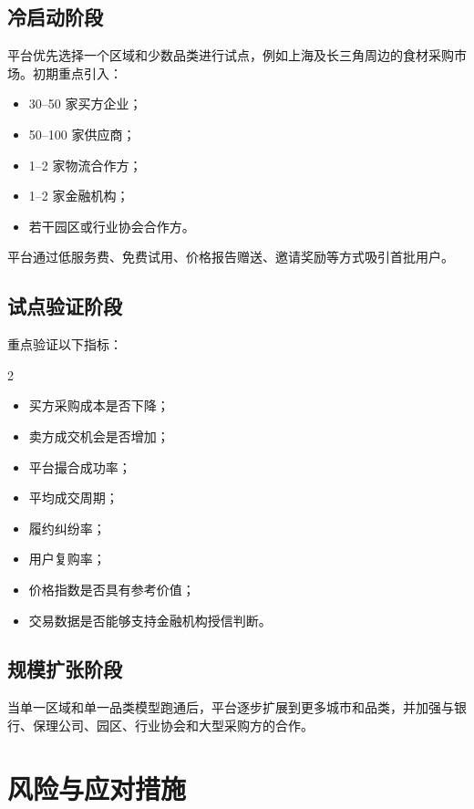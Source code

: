 \documentclass[UTF8,11pt]{ctexart}
\begin{document}
\subsection{冷启动阶段}

平台优先选择一个区域和少数品类进行试点，例如上海及长三角周边的食材采购市场。初期重点引入：

\begin{itemize}
    \item 30--50 家买方企业；
    \item 50--100 家供应商；
    \item 1--2 家物流合作方；
    \item 1--2 家金融机构；
    \item 若干园区或行业协会合作方。
\end{itemize}

平台通过低服务费、免费试用、价格报告赠送、邀请奖励等方式吸引首批用户。

\subsection{试点验证阶段}

重点验证以下指标：

\vspace{-0.5em}
\begin{multicols}{2}
    \begin{itemize}
        \item 买方采购成本是否下降；
        \item 卖方成交机会是否增加；
        \item 平台撮合成功率；
        \item 平均成交周期；
        \item 履约纠纷率；
        \item 用户复购率；
        \item 价格指数是否具有参考价值；
        \item 交易数据是否能够支持金融机构授信判断。
    \end{itemize}
\end{multicols}

\subsection{规模扩张阶段}

当单一区域和单一品类模型跑通后，平台逐步扩展到更多城市和品类，并加强与银行、保理公司、园区、行业协会和大型采购方的合作。

\section{风险与应对措施}
\end{document}
